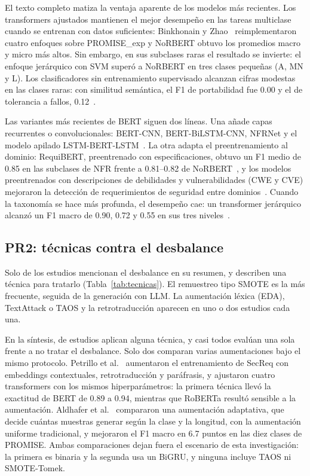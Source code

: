 \documentclass[conference]{IEEEtran}
\begin{document}
El texto completo matiza la ventaja aparente de los modelos más recientes. Los transformers ajustados mantienen el mejor desempeño en las tareas multiclase cuando se entrenan con datos suficientes: Binkhonain y Zhao~\cite{Binkhonain2023-Machine} reimplementaron cuatro enfoques sobre PROMISE\_exp y NoRBERT obtuvo los promedios macro y micro más altos. Sin embargo, en sus subclases raras el resultado se invierte: el enfoque jerárquico con SVM superó a NoRBERT en tres clases pequeñas (A, MN y L). Los clasificadores sin entrenamiento supervisado alcanzan cifras modestas en las clases raras: con similitud semántica, el F1 de portabilidad fue 0.00 y el de tolerancia a fallos, 0.12~\cite{Younas2019-Automated}.

Las variantes más recientes de BERT siguen dos líneas. Una añade capas recurrentes o convolucionales: BERT-CNN, BERT-BiLSTM-CNN, NFRNet y el modelo apilado LSTM-BERT-LSTM~\cite{Kaur2022-Bert,Kaur2023-Improving,Li2022-Automatically,Kaur2026-Hybrid}. La otra adapta el preentrenamiento al dominio: RequiBERT, preentrenado con especificaciones, obtuvo un F1 medio de 0.85 en las subclases de NFR frente a 0.81--0.82 de NoRBERT~\cite{Rahman2026-RequiBERT}, y los modelos preentrenados con descripciones de debilidades y vulnerabilidades (CWE y CVE) mejoraron la detección de requerimientos de seguridad entre dominios~\cite{Casillo2025-Beyond}. Cuando la taxonomía se hace más profunda, el desempeño cae: un transformer jerárquico alcanzó un F1 macro de 0.90, 0.72 y 0.55 en sus tres niveles~\cite{NguyenVan2026-Evaluating}.

\subsection{PR2: técnicas contra el desbalance}\label{sec:pr2}
Solo \nMapeoDesbalance{} de los \nMapeo{} estudios mencionan el desbalance en su resumen, y \nMapeoTecnica{} describen una técnica para tratarlo (Tabla~\ref{tab:tecnicas}). El remuestreo tipo SMOTE es la más frecuente, seguida de la generación con LLM. La aumentación léxica (EDA), TextAttack o TAOS y la retrotraducción aparecen en uno o dos estudios cada una.

\tablaTecnicas

En la síntesis, \nTecnica{} de \nSintesis{} estudios aplican alguna técnica, y casi todos evalúan una sola frente a no tratar el desbalance. Solo dos comparan varias aumentaciones bajo el mismo protocolo. Petrillo et al.~\cite{Petrillo2025-Explainable} aumentaron el entrenamiento de SecReq con embeddings contextuales, retrotraducción y paráfrasis, y ajustaron cuatro transformers con los mismos hiperparámetros: la primera técnica llevó la exactitud de BERT de 0.89 a 0.94, mientras que RoBERTa resultó sensible a la aumentación. Aldhafer et al.~\cite{Aldhafer2026-Adaptive} compararon una aumentación adaptativa, que decide cuántas muestras generar según la clase y la longitud, con la aumentación uniforme tradicional, y mejoraron el F1 macro en 6.7 puntos en las diez clases de PROMISE. Ambas comparaciones dejan fuera el escenario de esta investigación: la primera es binaria y la segunda usa un BiGRU, y ninguna incluye TAOS ni SMOTE-Tomek.
\end{document}
